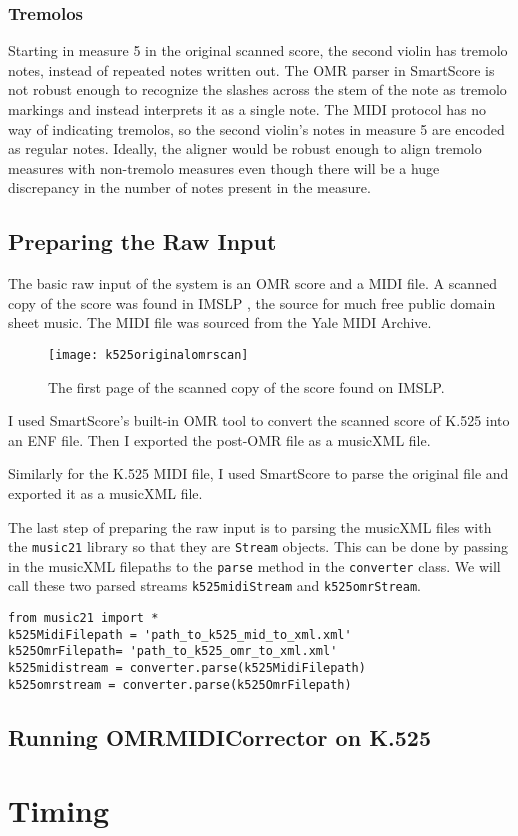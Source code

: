 \subsubsection{Tremolos}
Starting in measure 5 in the original scanned score, the second violin has tremolo notes, instead of repeated  notes written out. The OMR parser in SmartScore is not robust enough to recognize the slashes across the stem of the note as tremolo markings and instead interprets it as a single note. The MIDI protocol has no way of indicating tremolos, so the second violin's notes in measure 5 are encoded as regular  notes. Ideally, the aligner would be robust enough to align tremolo measures with non-tremolo measures even though there will be a huge discrepancy in the number of notes present in the measure.

\subsection{Preparing the Raw Input}
The basic raw input of the system is an OMR score and a MIDI file. A scanned copy of the score was found in IMSLP \cite{k525}, the source for much free public domain sheet music. The MIDI file was sourced from the Yale MIDI Archive. 

\begin{figure}[H]
\centering
\texttt{[image: k525originalomrscan]}
\caption{The first page of the scanned copy of the score found on IMSLP.}
\end{figure}

I used SmartScore's built-in OMR tool to convert the scanned score of K.525 into an ENF file. Then I exported the post-OMR file as a musicXML file.

Similarly for the K.525 MIDI file, I used SmartScore to parse the original file and exported it as a musicXML file. 

The last step of preparing the raw input is to parsing the musicXML files with the \texttt{music21} library so that they are \texttt{Stream} objects. This can be done by passing in the musicXML filepaths to the \texttt{parse} method in the \texttt{converter} class. We will call these two parsed streams \texttt{k525midiStream} and \texttt{k525omrStream}. 

\begin{verbatim}
from music21 import *
k525MidiFilepath = 'path_to_k525_mid_to_xml.xml'
k525OmrFilepath= 'path_to_k525_omr_to_xml.xml'
k525midistream = converter.parse(k525MidiFilepath)
k525omrstream = converter.parse(k525OmrFilepath)
\end{verbatim}

\subsection{Running OMRMIDICorrector on K.525}

\section{Timing} \label{timing}

